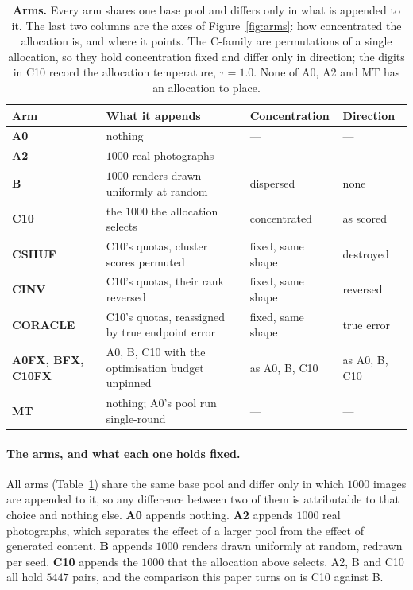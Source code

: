 \documentclass{article}
\newcommand{\atemp}{\tau}
\begin{document}
\begin{table}[t]
\caption{\textbf{Arms.} Every arm shares one base pool and differs only in what is appended to it.
The last two columns are the axes of Figure~\ref{fig:arms}: how concentrated the allocation is, and
where it points. The C-family are permutations of a single allocation, so they hold concentration
fixed and differ only in direction; the digits in C10 record the allocation temperature,
$\atemp = 1.0$. None of A0, A2 and MT has an allocation to place.}
\label{tab:arms}
\begin{center}
\small
\setlength{\tabcolsep}{4pt}
\begin{tabular}{@{}llll@{}}
\toprule
Arm & What it appends & Concentration & Direction \\
\midrule
\textbf{A0} & nothing & --- & --- \\
\textbf{A2} & $1000$ real photographs & --- & --- \\
\textbf{B} & $1000$ renders drawn uniformly at random & dispersed & none \\
\textbf{C10} & the $1000$ the allocation selects & concentrated & as scored \\
\midrule
\textbf{CSHUF} & C10's quotas, cluster scores permuted & fixed, same shape & destroyed \\
\textbf{CINV} & C10's quotas, their rank reversed & fixed, same shape & reversed \\
\textbf{CORACLE} & C10's quotas, reassigned by true endpoint error & fixed, same shape & true error \\
\midrule
\textbf{A0FX, BFX, C10FX} & A0, B, C10 with the optimisation budget unpinned & as A0, B, C10 & as A0, B, C10 \\
\textbf{MT} & nothing; A0's pool run single-round & --- & --- \\
\bottomrule
\end{tabular}
\end{center}
\end{table}

\paragraph{The arms, and what each one holds fixed.} All arms (Table~\ref{tab:arms}) share the same base pool and differ
only in which $1000$ images are appended to it, so any difference between two of them is
attributable to that choice and nothing else. \textbf{A0} appends
nothing. \textbf{A2} appends $1000$ real photographs, which separates the effect of a larger pool
from the effect of generated content. \textbf{B} appends $1000$ renders drawn uniformly at random,
redrawn per seed. \textbf{C10} appends the $1000$ that the allocation above selects. A2, B and C10
all hold $5447$ pairs, and the comparison this paper turns on is C10 against B.
\end{document}
